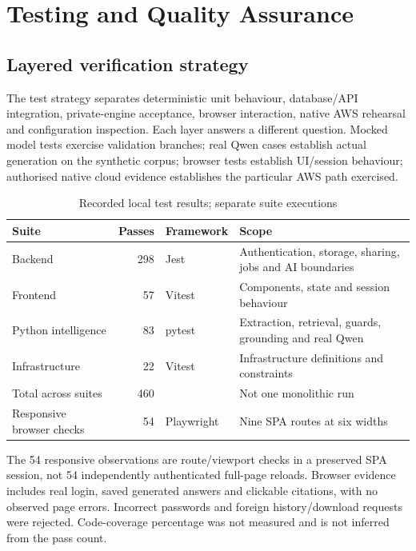 \chapter{Testing and Quality Assurance}
\section{Layered verification strategy}
The test strategy separates deterministic unit behaviour, database/API integration, private-engine acceptance, browser interaction, native AWS rehearsal and configuration inspection. Each layer answers a different question. Mocked model tests exercise validation branches; real Qwen cases establish actual generation on the synthetic corpus; browser tests establish UI/session behaviour; authorised native cloud evidence establishes the particular AWS path exercised.
\par\begin{table}[htbp]\caption{Recorded local test results; separate suite executions}\label{tab:tests}\small\begin{tabularx}{\linewidth}{YrlY}\toprule Suite&Passes&Framework&Scope\\\midrule
Backend&298&Jest&Authentication, storage, sharing, jobs and AI boundaries\\
Frontend&57&Vitest&Components, state and session behaviour\\
Python intelligence&83&pytest&Extraction, retrieval, guards, grounding and real Qwen\\
Infrastructure&22&Vitest&Infrastructure definitions and constraints\\\midrule
Total across suites&460&&Not one monolithic run\\
Responsive browser checks&54&Playwright&Nine SPA routes at six widths\\\bottomrule\end{tabularx}\end{table}\par
The 54 responsive observations are route/viewport checks in a preserved SPA session, not 54 independently authenticated full-page reloads. Browser evidence includes real login, saved generated answers and clickable citations, with no observed page errors. Incorrect passwords and foreign history/download requests were rejected. Code-coverage percentage was not measured and is not inferred from the pass count.
